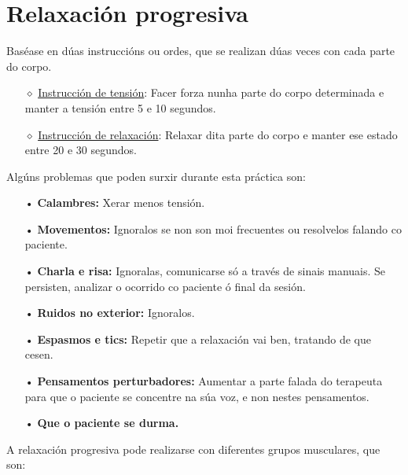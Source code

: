 \documentclass[a4paper,11pt]{article}
\begin{document}
\section{Relaxación progresiva}
Baséase en dúas instruccións ou ordes, que se realizan dúas veces con cada parte do corpo.
\begin{itemize}
	\item[$\diamond$] \underline{Instrucción de tensión}: Facer forza nunha parte do corpo 
	determinada e manter a tensión entre 5 e 10 segundos.
	\item[$\diamond$] \underline{Instrucción de relaxación}: Relaxar dita parte do corpo e manter ese 
	estado entre 20 e 30 segundos.
\end{itemize}

Algúns problemas que poden surxir durante esta práctica son: 
\begin{itemize}
	\item[•] \textbf{Calambres:} Xerar menos tensión.
	\item[•] \textbf{Movementos:} Ignoralos se non son moi frecuentes ou resolvelos falando co 
	paciente.
	\item[•] \textbf{Charla e risa:} Ignoralas, comunicarse só a través de sinais manuais. Se 
	persisten, analizar o ocorrido co paciente ó final da sesión.
	\item[•] \textbf{Ruidos no exterior:} Ignoralos.
	\item[•] \textbf{Espasmos e tics:} Repetir que a relaxación vai ben, tratando de que cesen.
	\item[•] \textbf{Pensamentos perturbadores:} Aumentar a parte falada do terapeuta para que o 
	paciente se concentre na súa voz, e non nestes pensamentos.
	\item[•] \textbf{Que o paciente se durma.}
\end{itemize}

A relaxación progresiva pode realizarse con diferentes grupos musculares, que son:
\end{document}
